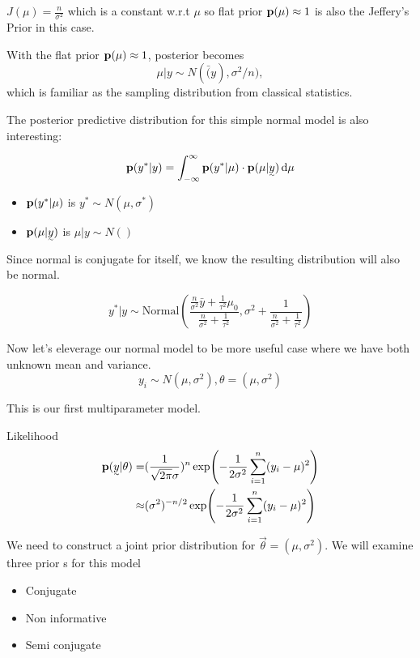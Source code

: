$J(\mu) = \frac{n}{\sigma^2}$ which is a constant w.r.t $\mu$ so flat prior ${\mathbf p}(\mu) \approx 1$ is also the Jeffery's Prior in this case.

With the flat prior ${\mathbf p}(\mu) \approx 1$, posterior becomes
\[
\mu | y \sim N(\bar(y), \sigma^2/n),
\]
which is familiar as the sampling distribution from classical statistics.

The posterior predictive distribution for this simple normal model is also interesting:

\[
\p(y^*| y) = \int_{-\infty}^{\infty} \p(y^*| \mu) \cdot \p(\mu| \vec{y}) \diff \mu 
\]

\begin{itemize}
    \item ${\mathbf p}(y^*| \mu)$ is $y^* \sim N(\mu, \sigma^*)$
    \item $\p(\mu| \vec{y})$ is $\mu|y \sim N()$
\end{itemize}

Since normal is conjugate for itself, we know the resulting distribution will also be normal.

\[
y^*|y \sim \text{Normal}(
\frac{\frac{n}{\sigma^2} \bar{y} + \frac{1}{\tau^2} \mu_0}{ \frac{n}{\sigma^2} + \frac{1}{\tau^2}},
\sigma^2 + \frac{1}{\frac{n}{\sigma^2} + \frac{1}{\tau^2}})
\]

Now let's eleverage our normal model to be more useful case where we have both unknown mean and variance.
\[
y_i \sim N(\mu, \sigma^2), \theta = (\mu, \sigma^2)
\]

This is our first multiparameter model.

Likelihood
\begin{align*}
    \p(\vec{y}| \theta) 
    =& (\frac{1}{\sqrt{2\pi}\sigma})^n \exp(-\frac{1}{2\sigma^2} \sum_{i=1}^n(y_i - \mu)^2)\\
    \approx& (\sigma^2)^{-n/2} \exp(-\frac{1}{2\sigma^2} \sum_{i=1}^n(y_i - \mu)^2)
\end{align*}

We need to construct a joint prior distribution for $\vec{\theta} = (\mu, \sigma^2)$. We will examine three prior s for this model
\begin{itemize}
    \item Conjugate
    \item Non informative
    \item Semi conjugate
\end{itemize}